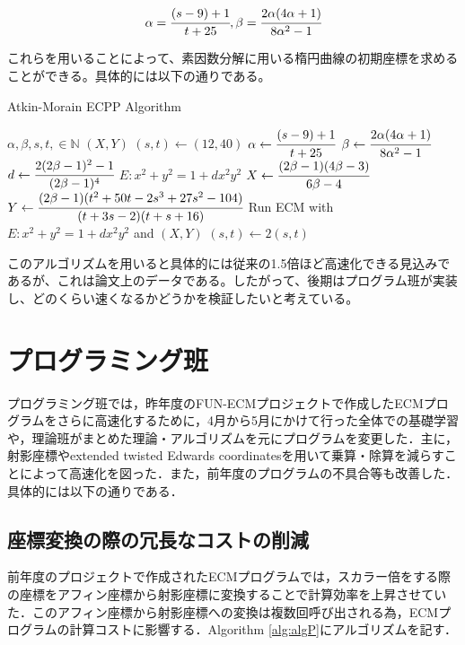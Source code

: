 \documentclass[openany,11pt,papersize]{jsbook}
\begin{document}
\begin{center}
\begin{equation}
\alpha =\cfrac{(s-9)+1}{t+25}  ,  \beta = \cfrac{2\alpha (4\alpha +1)}{8\alpha^2-1}
\end{equation}
\end{center}
これらを用いることによって、素因数分解に用いる楕円曲線の初期座標を求めることができる。具体的には以下の通りである。

\begin{algorithm}[h]                   
\caption{Atkin-Morain ECPP Algorithm}
\label{alg E}                          
\begin{algorithmic}                  
\REQUIRE $\alpha,\beta,s,t,\in \mathbb{N}$
\ENSURE $(X,Y)$
\STATE $(s,t) \leftarrow(12,40)$
\STATE $\alpha \leftarrow \cfrac{(s-9)+1}{t+25}$
\STATE $\beta \leftarrow \cfrac{2\alpha (4\alpha +1)}{8\alpha^2-1}$
\STATE $d \leftarrow \cfrac{2(2\beta -1)^2-1}{(2\beta -1)^4}$
\STATE $E:x^2+y^2=1+dx^2y^2$
\STATE $X \leftarrow \cfrac{(2\beta -1)(4\beta -3)}{6\beta -4}$
\STATE $Y \leftarrow \cfrac{(2\beta-1)(t^2+50t-2s^3+27s^2-104)}{(t+3s-2)(t+s+16)}$
\STATE Run ECM with $E:x^2+y^2=1+dx^2y^2$ and $(X,Y)$
\STATE $(s,t) \leftarrow 2(s,t)$
\ENDWHILE
\end{algorithmic}
\end{algorithm}

このアルゴリズムを用いると具体的には従来の1.5倍ほど高速化できる見込みであるが、これは論文上のデータである。したがって、後期はプログラム班が実装し、どのくらい速くなるかどうかを検証したいと考えている。


\section{プログラミング班}
プログラミング班では，昨年度のFUN-ECMプロジェクトで作成したECMプログラムをさらに高速化するために，4月から5月にかけて行った全体での基礎学習や，理論班がまとめた理論・アルゴリズムを元にプログラムを変更した．主に，射影座標やextended twisted Edwards coordinatesを用いて乗算・除算を減らすことによって高速化を図った．また，前年度のプログラムの不具合等も改善した．具体的には以下の通りである．


\subsection{座標変換の際の冗長なコストの削減}\label{sec:alg1}
前年度のプロジェクトで作成されたECMプログラムでは，スカラー倍をする際の座標をアフィン座標から射影座標に変換することで計算効率を上昇させていた．このアフィン座標から射影座標への変換は複数回呼び出される為，ECMプログラムの計算コストに影響する．Algorithm \ref{alg:algP}にアルゴリズムを記す．
\end{document}
